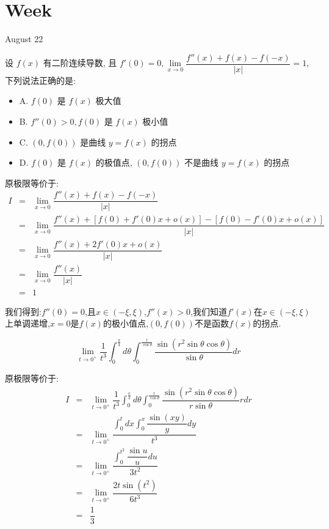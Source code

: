 \section{Week }
\textcolor{purplea}{August 22}

\begin{example}[][Exam: 34.4.1]
	设 $f(x)$ 有二阶连续导数, 且 $f'(0)=0, \lim\limits_{x\to 0}\dfrac{f''(x)+f(x)-f(-x)}{|x|}=1$,下列说法正确的是:
\begin{itemize}
	\item A. $f(0)$ 是 $f(x)$ 极大值
	\item B. $f''(0)>0, f(0)$ 是 $f(x)$ 极小值
	\item C. $(0,f(0))$ 是曲线 $y=f(x)$ 的拐点
	\item D. $f(0)$ 是 $f(x)$ 的极值点, $(0,f(0))$ 不是曲线 $y=f(x)$ 的拐点
\end{itemize}
\end{example}

\begin{solution}

	原极限等价于:  
	\begin{eqnarray*}
		I&=&\lim\limits_{x\to 0}\dfrac{f''(x)+f(x)-f(-x)}{|x|}\\
		&=&\lim\limits_{x\to 0}\dfrac{f''(x)+\left[f(0)+f'(0)x+o(x)\right] -\left[ f(0)-f'(0)x+o(x)\right]}{|x|}\\
		&=&\lim\limits_{x\to 0}\dfrac{f''(x)+2f'(0)x+o(x)}{|x|}\\
		&=&\lim\limits_{x\to 0}\dfrac{f''(x)}{|x|}\\
		&=&1
	\end{eqnarray*}

	我们得到:$f''(0)=0$,且$x\in(-\xi,\xi)$,$f''(x)>0$,我们知道$f'(x)$在$x\in(-\xi,\xi)$上单调递增,$x=0$是$f(x)$的极小值点,$(0,f(0))$不是函数$f(x)$的拐点.
\end{solution}

\begin{example}[][Exam: 34.4.2]
	$$\lim\limits_{t\to 0^{+}}\dfrac{1}{t^3}\int_{0}^{\frac{\pi}{4}}d\theta\int_{0}^{\frac{t}{\cos \theta}}\dfrac{\sin(r^2\sin\theta\cos\theta)}{\sin\theta}dr$$
\end{example}
\begin{solution}

	原极限等价于:  
	\begin{eqnarray*}
		I&=&\lim\limits_{t\to 0^{+}}\dfrac{1}{t^3}\int_{0}^{\frac{\pi}{4}}d\theta\int_{0}^{\frac{t}{\cos \theta}}\dfrac{\sin(r^2\sin\theta\cos\theta)}{r\sin\theta}rdr\\
		&=&\lim\limits_{t\to 0^{+}}\dfrac{\int_{0}^{t}dx\int_{0}^{x}\dfrac{\sin(xy)}{y}dy}{t^3}\\
		&=&\lim\limits_{t\to 0^{+}}\dfrac{\int_{0}^{t^2}\dfrac{\sin u}{u}du}{3t^2}\\
		&=&\lim\limits_{t\to 0^{+}}\dfrac{2t\sin(t^2)}{6t^3}\\
		&=&\dfrac{1}{3}
	\end{eqnarray*}
\end{solution}


